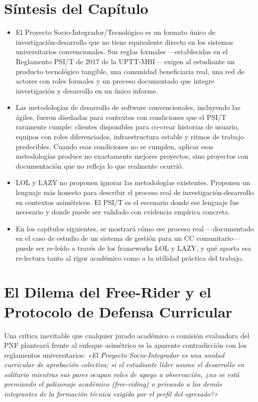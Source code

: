 \documentclass[14pt,a4paper,oneside]{extbook}
\begin{document}
\section{Síntesis del Capítulo}
\begin{itemize}
\item El Proyecto Socio-Integrador/Tecnológico es un formato único de investigación-desarrollo que no tiene equivalente directo en los sistemas universitarios convencionales. Sus reglas formales ---establecidas en el Reglamento PSI/T de 2017 de la UPTT-MBI--- exigen al estudiante un producto tecnológico tangible, una comunidad beneficiaria real, una red de actores con roles formales y un proceso documentado que integre investigación y desarrollo en un único informe.
\item Las metodologías de desarrollo de software convencionales, incluyendo las ágiles, fueron diseñadas para contextos con condiciones que el PSI/T raramente cumple: clientes disponibles para co-crear historias de usuario, equipos con roles diferenciados, infraestructura estable y ritmos de trabajo predecibles. Cuando esas condiciones no se cumplen, aplicar esas metodologías produce no exactamente mejores proyectos, sino proyectos con documentación que no refleja lo que realmente ocurrió.
\item LOL y LAZY no proponen ignorar las metodologías existentes. Proponen un lenguaje más honesto para describir el proceso real de investigación-desarrollo en contextos asimétricos. El PSI/T es el escenario donde ese lenguaje fue necesario y donde puede ser validado con evidencia empírica concreta.
\item En los capítulos siguientes, se mostrará cómo ese proceso real ---documentado en el caso de estudio de un sistema de gestión para un CC comunitario--- puede ser re-leído a través de los frameworks LOL y LAZY, y qué aporta esa re-lectura tanto al rigor académico como a la utilidad práctica del trabajo.
\end{itemize}

\section{El Dilema del Free-Rider y el Protocolo de Defensa Curricular}

Una crítica inevitable que cualquier jurado académico o comisión evaluadora del PNF planteará frente al enfoque asimétrico es la aparente contradicción con los reglamentos universitarios: \textit{«El Proyecto Socio-Integrador es una unidad curricular de aprobación colectiva; si el estudiante líder asume el desarrollo en solitario mientras sus pares ocupan roles de apoyo u observación, ¿no se está premiando el polizonaje académico (free-riding) o privando a los demás integrantes de la formación técnica exigida por el perfil del egresado?»}
\end{document}
